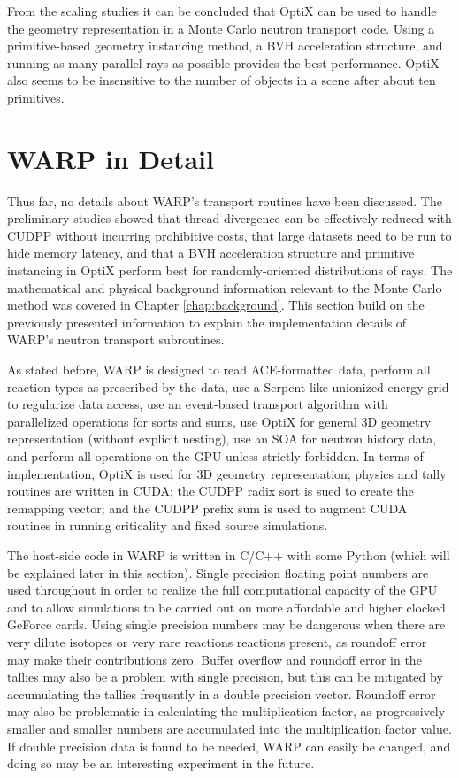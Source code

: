 From the scaling studies it can be concluded that OptiX can be used to handle the geometry representation in a Monte Carlo neutron transport code.  Using a primitive-based geometry instancing method, a BVH acceleration structure, and running as many parallel rays as possible provides the best performance.  OptiX also seems to be insensitive to the number of objects in a scene after about ten primitives.


\section{WARP in Detail}

Thus far, no details about WARP's transport routines have been discussed. The preliminary studies showed that thread divergence can be effectively reduced with CUDPP without incurring prohibitive costs, that large datasets need to be run to hide memory latency, and that a BVH acceleration structure and primitive instancing in OptiX perform best for randomly-oriented distributions of rays.  The mathematical and physical background information relevant to the Monte Carlo method was covered in Chapter \ref{chap:background}.  This section build on the previously presented information to explain the implementation details of WARP's neutron transport subroutines.

As stated before, WARP is designed to read ACE-formatted data, perform all reaction types as prescribed by the data, use a Serpent-like unionized energy grid to regularize data access, use an event-based transport algorithm with parallelized operations for sorts and sums, use OptiX for general 3D geometry representation (without explicit nesting), use an SOA for neutron history data, and perform all operations on the GPU unless strictly forbidden.  In terms of implementation, OptiX is used for 3D geometry representation; physics and tally routines are written in CUDA; the CUDPP radix sort is sued to create the remapping vector; and the CUDPP prefix sum is used to augment CUDA routines in running criticality and fixed source simulations. 

The host-side code in WARP is written in C/C++ with some Python (which will be explained later in this section).  Single precision floating point numbers are used throughout in order to realize the full computational capacity of the GPU and to allow simulations to be carried out on more affordable and higher clocked GeForce cards.  Using single precision numbers may be dangerous when there are very dilute isotopes or very rare reactions reactions present, as roundoff error may make their contributions zero.  Buffer overflow and roundoff error in the tallies may also be a problem with single precision, but this can be mitigated by accumulating the tallies frequently in a double precision vector.   Roundoff error may also be problematic in calculating the multiplication factor, as progressively smaller and smaller numbers are accumulated into the multiplication factor value.  If double precision data is found to be needed, WARP can easily be changed, and doing so may be an interesting experiment in the future.


